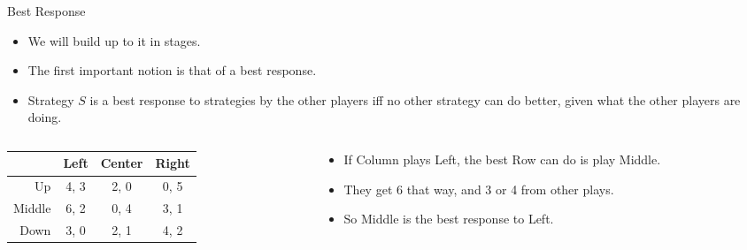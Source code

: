 \documentclass[
  14pt,
  letterpaper,
  ignorenonframetext,
  aspectratio=169,
]{beamer}
\providecommand{\tightlist}{%
  \setlength{\itemsep}{0pt}\setlength{\parskip}{0pt}}\usepackage{longtable,booktabs,array}
\let\olditem\item
\renewcommand{\item}{%
\olditem\vspace{6pt}}
\begin{document}
\begin{frame}{Best Response}
\protect\hypertarget{best-response}{}
\begin{itemize}[<+->]
\tightlist
\item
  We will build up to it in stages.
\item
  The first important notion is that of a best response.
\item
  Strategy \(S\) is a best response to strategies by the other players
  iff no other strategy can do better, given what the other players are
  doing.
\end{itemize}
\end{frame}

\begin{frame}[plain]{}
\protect\hypertarget{section-9}{}
\begin{columns}[T]
\begin{column}{0.5\textwidth}
\begin{table}[!h]
\centering
\begin{tabular}[t]{>{}r|ccc}
\toprule
 & Left & Center & Right\\
\midrule
Up & 4, 3 & 2, 0 & 0, 5\\
Middle & 6, 2 & 0, 4 & 3, 1\\
Down & 3, 0 & 2, 1 & 4, 2\\
\bottomrule
\end{tabular}
\end{table}
\end{column}

\begin{column}{0.5\textwidth}
\begin{itemize}[<+->]
\tightlist
\item
  If Column plays Left, the best Row can do is play Middle.
\item
  They get 6 that way, and 3 or 4 from other plays.
\item
  So Middle is the best response to Left.
\end{itemize}
\end{column}
\end{columns}
\end{frame}
\end{document}
